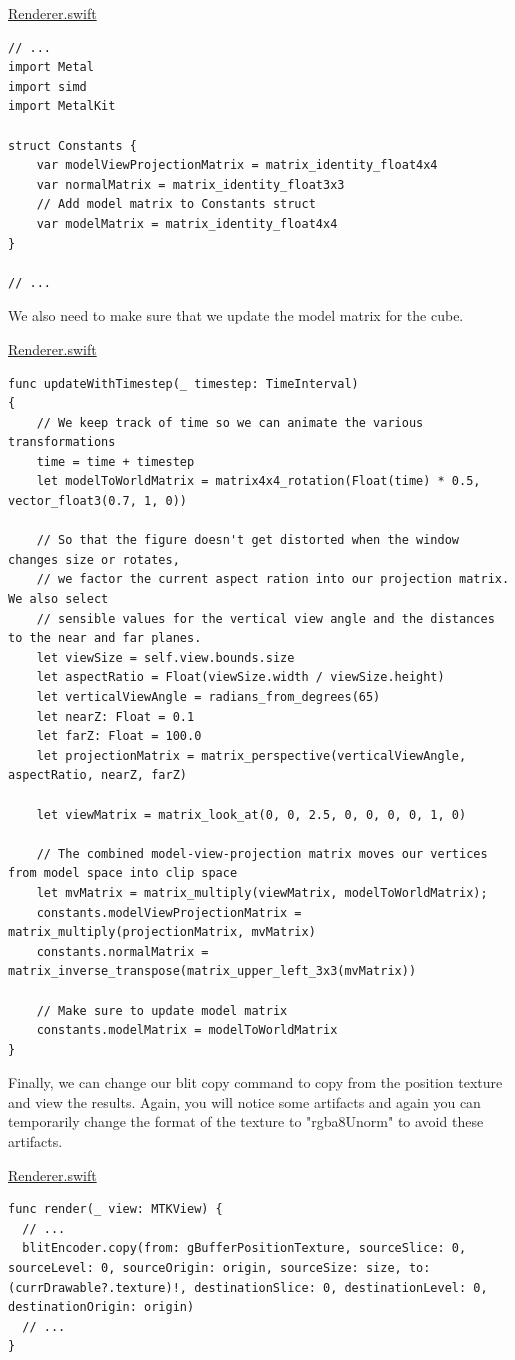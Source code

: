 \documentclass[11pt]{article}
\begin{document}
\uline{Renderer.swift}
\begin{verbatim}
// ...
import Metal
import simd
import MetalKit

struct Constants {
    var modelViewProjectionMatrix = matrix_identity_float4x4
    var normalMatrix = matrix_identity_float3x3
    // Add model matrix to Constants struct
    var modelMatrix = matrix_identity_float4x4
}

// ...
\end{verbatim}

We also need to make sure that we update the model matrix for the cube.

\uline{Renderer.swift}
\begin{verbatim}
func updateWithTimestep(_ timestep: TimeInterval)
{
    // We keep track of time so we can animate the various transformations
    time = time + timestep
    let modelToWorldMatrix = matrix4x4_rotation(Float(time) * 0.5, vector_float3(0.7, 1, 0))

    // So that the figure doesn't get distorted when the window changes size or rotates,
    // we factor the current aspect ration into our projection matrix. We also select
    // sensible values for the vertical view angle and the distances to the near and far planes.
    let viewSize = self.view.bounds.size
    let aspectRatio = Float(viewSize.width / viewSize.height)
    let verticalViewAngle = radians_from_degrees(65)
    let nearZ: Float = 0.1
    let farZ: Float = 100.0
    let projectionMatrix = matrix_perspective(verticalViewAngle, aspectRatio, nearZ, farZ)

    let viewMatrix = matrix_look_at(0, 0, 2.5, 0, 0, 0, 0, 1, 0)

    // The combined model-view-projection matrix moves our vertices from model space into clip space
    let mvMatrix = matrix_multiply(viewMatrix, modelToWorldMatrix);
    constants.modelViewProjectionMatrix = matrix_multiply(projectionMatrix, mvMatrix)
    constants.normalMatrix = matrix_inverse_transpose(matrix_upper_left_3x3(mvMatrix))

    // Make sure to update model matrix
    constants.modelMatrix = modelToWorldMatrix
}
\end{verbatim}

Finally, we can change our blit copy command to copy from the position texture and view the results. Again, you will notice some artifacts and again you can temporarily change the format of the texture to "rgba8Unorm" to avoid these artifacts.

\uline{Renderer.swift}
\begin{verbatim}
func render(_ view: MTKView) {
  // ...
  blitEncoder.copy(from: gBufferPositionTexture, sourceSlice: 0, sourceLevel: 0, sourceOrigin: origin, sourceSize: size, to: (currDrawable?.texture)!, destinationSlice: 0, destinationLevel: 0, destinationOrigin: origin)
  // ...
}
\end{verbatim}
\end{document}
